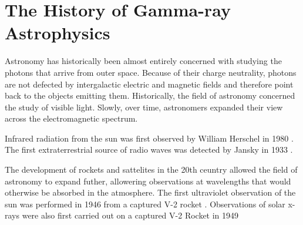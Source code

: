 
\section{The History of Gamma-ray Astrophysics}








Astronomy has historically been almost entirely concerned with studying
the photons that arrive from outer space.  Because of their charge
neutrality, photons are not defected by intergalactic electric and
magnetic fields and therefore point back to the objects 
emitting them. Historically, the field of astronomy concerned
the study of visible light.  Slowly, over time, astronomers 
expanded their view across the electromagnetic spectrum.

Infrared radiation from the sun was first observed by
William Herschel in 1980 \citep{infrared_herschel_1800}.
The first extraterrestrial source of radio waves was detected
by Jansky in 1933 \citep{radio_extraterrestrial_jansky_1933}.

The development of rockets and sattelites in the 20th ceuntry allowed
the field of astronomy to expand futher, allowering observations
at wavelengths that would otherwise be absorbed in the atmosphere.
The first ultraviolet observation of the sun was performed in 1946 from a
captured V-2 rocket \citep{ultraviolet_sun_baum_1946}.  Observations of
solar x-rays were also first carried out on a captured V-2 Rocket in
1949 \citep{x_rays_burnight_1949}

